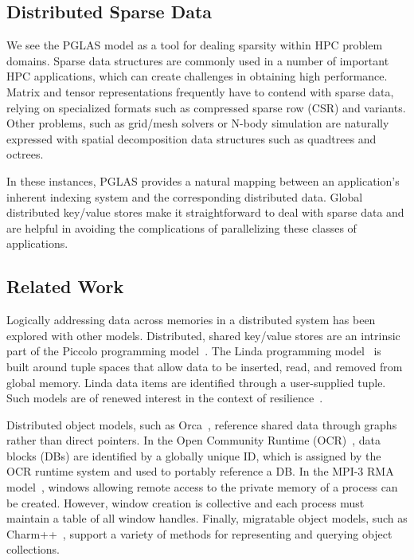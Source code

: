 \subsection{Distributed Sparse Data}

We see the PGLAS model as a tool for dealing sparsity within HPC problem domains.  
Sparse data structures are commonly used in a number of important HPC 
applications, which can create challenges in obtaining high performance. Matrix 
and tensor representations frequently have to contend with sparse data, 
relying on specialized formats such as compressed sparse row (CSR) and variants.  
Other problems, such as grid/mesh solvers or N-body simulation are naturally 
expressed with spatial decomposition data structures such as quadtrees and 
octrees. 

In these instances, PGLAS provides a natural mapping between an application's 
inherent indexing system and the corresponding distributed data. Global 
distributed key/value stores make it straightforward to deal with sparse data 
and are helpful in avoiding the complications of parallelizing 
these classes of applications.

\subsection{Related Work} 

Logically addressing data across memories in a distributed
system has been explored with other models.  Distributed,
shared key/value stores are an intrinsic part of the Piccolo
programming model~\cite{power:10}. The Linda programming
model~\cite{ahuja:86} is built around tuple spaces that allow data
to be inserted, read, and removed from global memory. Linda data items
are identified through a user-supplied tuple. Such models are of
renewed interest in the context of resilience~\cite{wilke:14}.

Distributed object models, such as Orca~\cite{bal:92}, reference
shared data through graphs rather than direct pointers.  In the Open
Community Runtime (OCR)~\cite{OCR}, data blocks (DBs) are identified
by a globally unique ID, which is assigned by the OCR runtime system
and used to portably reference a DB.  In the MPI-3 RMA 
model~\cite{mpi-forum:15}, windows allowing remote
access to the private memory of a process can be created.  However,
window creation is collective and each process must maintain a table of
all window handles.  Finally, migratable object
models, such as Charm++~\cite{kale:93}, support a variety of methods
for representing and querying object collections.


